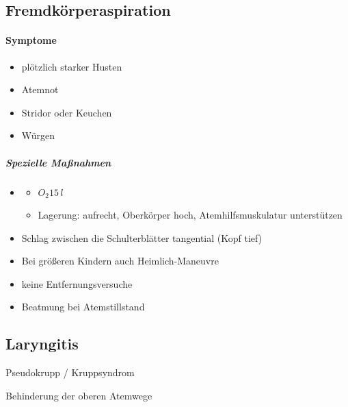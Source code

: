 \subsection{Fremdkörperaspiration }


\paragraph{Symptome}

\begin{itemize}
    \item plötzlich starker Husten
    \item Atemnot
    \item Stridor oder Keuchen
    \item W\"urgen
\end{itemize}

\begin{gMassnahmenEnv}
    
\subparagraph*{Spezielle Maßnahmen}

\begin{itemize}
    \item \gTxMassVitBes
    \begin{itemize}
        \item $O_2 15\,l$
        \item Lagerung: aufrecht, Oberkörper hoch,
        Atemhilfsmuskulatur unterstützen
    \end{itemize}
    \item Schlag zwischen die Schulterblätter tangential  (Kopf tief)
    \item Bei grö{\ss}eren Kindern auch Heimlich-Maneuvre
    \item keine Entfernungsversuche
    \item Beatmung bei Atemstillstand
\end{itemize}

\end{gMassnahmenEnv}

\subsection{Laryngitis}

Pseudokrupp / Kruppsyndrom

Behinderung der oberen Atemwege

